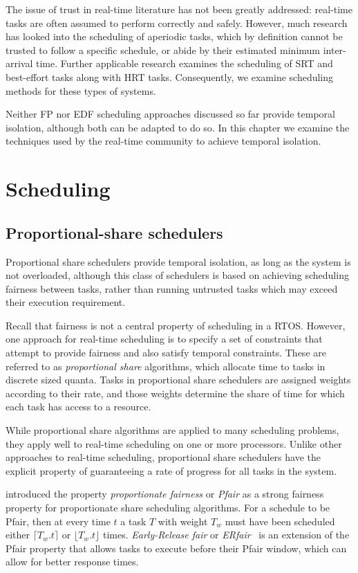 The issue of trust in real-time literature has not been greatly addressed: real-time tasks are often
assumed to perform correctly and safely.  However, much research has looked into the scheduling of
aperiodic tasks, which by definition cannot be trusted to follow a specific schedule, or abide by
their estimated minimum inter-arrival time. Further applicable research examines the scheduling of
\gls{SRT} and best-effort tasks along with \gls{HRT} tasks. Consequently, we examine scheduling methods for
these types of systems. 

Neither \gls{FP} nor \gls{EDF} scheduling
approaches discussed so far provide temporal isolation, although both can be adapted to do so.  In
this chapter we examine the techniques used by the real-time community to achieve temporal
isolation.

\section{Scheduling}


\subsection{Proportional-share schedulers}
\label{s:pfair}

Proportional share schedulers provide temporal isolation, as long as the system is not overloaded,
although this class of schedulers is based on achieving scheduling fairness between tasks, rather
than running untrusted tasks which may exceed their execution requirement. 

Recall that fairness is not a central property of scheduling in a \acrlong{RTOS}. However, one approach
for real-time scheduling is to specify a set of constraints that attempt to provide fairness and
also satisfy temporal constraints.  These are referred to as \emph{proportional share} algorithms,
which allocate time to tasks in discrete sized quanta. Tasks in proportional share schedulers are assigned 
weights according to their rate, and those weights determine the share of time for which each task 
has access to a resource.

While proportional share algorithms are applied to many scheduling problems, they apply
well to real-time scheduling on one or more processors.
Unlike other approaches to real-time scheduling, proportional share schedulers have the explicit property of guaranteeing a rate of progress for all tasks in the system.

\citet{Baruah_CPV_96} introduced the property \emph{proportionate fairness} or \emph{Pfair} as a
strong fairness property for proportionate share scheduling algorithms.  For a schedule to be Pfair,
then at every time $t$ a task $T$ with weight $T_{w}$ must have been scheduled either $\lceil T_{w}
. t \rceil$ or $\lfloor T_{w}.t \rfloor $ times.  \emph{Early-Release fair} or
\emph{ERfair}~\citep{Anderson_Srinivasan_04} is an extension of the Pfair property that allows tasks to
execute before their Pfair window, which can allow for better response times.

